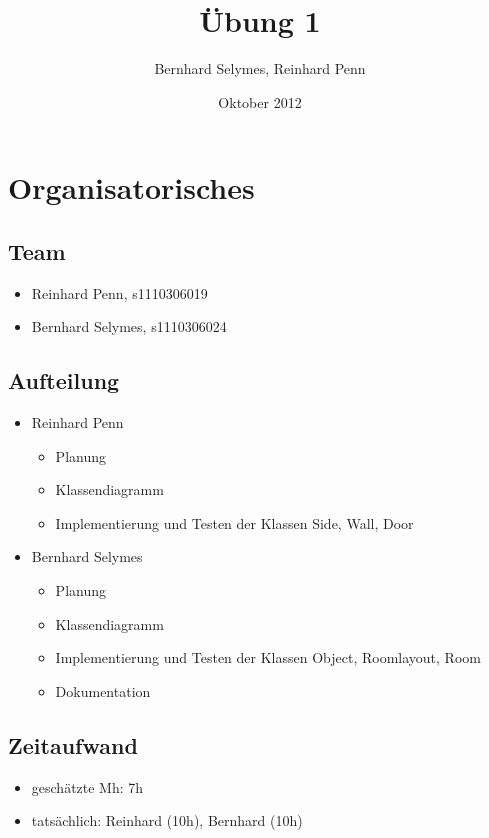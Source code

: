 \documentclass[12pt,a4paper]{article}
\begin{document}
\title{Übung 1}
\author{Bernhard Selymes, Reinhard Penn}
\date{Oktober 2012}

\normalsize

\newcommand{\CodePath}{../RoomLayout/RoomLayout/}

\section{Organisatorisches}

\subsection{Team}
	\begin {itemize} 
		\item Reinhard Penn, s1110306019 
		\item Bernhard Selymes, s1110306024
	\end {itemize}

\subsection{Aufteilung}
	\begin {itemize} 
		\item Reinhard Penn
			\begin {itemize}
				\item Planung
				\item Klassendiagramm
				\item Implementierung und Testen der Klassen Side, Wall, Door				
			\end {itemize}
		\item Bernhard Selymes
			\begin {itemize}
				\item Planung
				\item Klassendiagramm
				\item Implementierung und Testen der Klassen Object, Roomlayout, Room
				\item Dokumentation				
			\end {itemize}
	\end {itemize}


\subsection{Zeitaufwand}
	\begin {itemize}
		\item geschätzte Mh: 7h
		\item tatsächlich: Reinhard (10h), Bernhard  (10h)

	\end {itemize}
\end{document}
